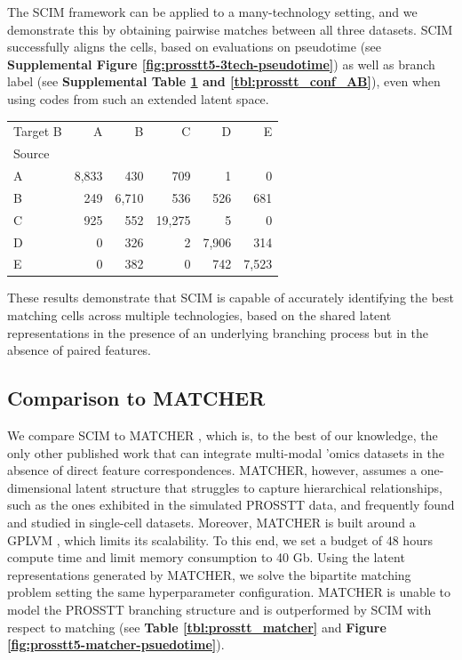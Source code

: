The SCIM framework can be applied to a many-technology setting, and we demonstrate this by obtaining pairwise matches between all three datasets. 
SCIM successfully aligns the cells, based on evaluations on pseudotime (see \textbf{Supplemental Figure \ref{fig:prosstt5-3tech-pseudotime}}) as well as branch label (see \textbf{Supplemental Table \ref{tbl:prosstt_conf_SB} and  \ref{tbl:prosstt_conf_AB}}), even when using codes from such an extended latent space. 

\begin{table}%
\begin{tabular}{lrrrrr}
\toprule
Target B &     A &     B &      C &     D &     E \\
Source &       &       &        &       &       \\
\midrule
A      &  8,833 &   430 &    709 &     1 &     0 \\
B      &   249 &  6,710 &    536 &   526 &   681 \\
C      &   925 &   552 &  19,275 &     5 &     0 \\
D      &     0 &   326 &      2 &  7,906 &   314 \\
E      &     0 &   382 &      0 &   742 &  7,523 \\
\bottomrule
\end{tabular}
\label{tbl:prosstt_conf_SB}
\end{table}

These results demonstrate that SCIM is capable of accurately identifying the best matching cells across multiple technologies, based on the shared latent representations in the presence of an underlying branching process but in the absence of paired features.

\subsection{Comparison to MATCHER}
We compare SCIM to MATCHER \citep{welch2017}, which is, to the best of our knowledge, the only other published work that can integrate multi-modal 'omics datasets in the absence of direct feature correspondences.
MATCHER, however, assumes a one-dimensional latent structure that struggles to capture hierarchical relationships, such as the ones exhibited in the simulated PROSSTT data, and frequently found and studied in single-cell datasets.
Moreover, MATCHER is built around a GPLVM \citep{lawrence2004}, which limits its scalability.
To this end, we set a budget of 48 hours compute time and limit memory consumption to 40 Gb.
Using the latent representations generated by MATCHER, we solve the bipartite matching problem setting the same hyperparameter configuration.
MATCHER is unable to model the PROSSTT branching structure and is outperformed by SCIM with respect to matching (see \textbf{Table  \ref{tbl:prosstt_matcher}} and \textbf{Figure \ref{fig:prosstt5-matcher-psuedotime}}).

